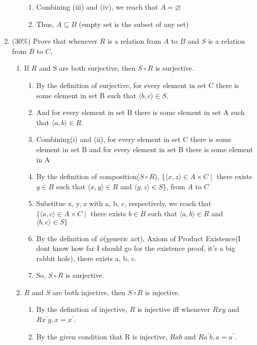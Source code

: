 \documentclass[10pt]{article}
\begin{document}
\begin{enumerate}
\begin{enumerate}
\begin{enumerate}
        \item Combining (iii) and (iv), we reach that $A = \varnothing$
        \item Thus, $A \subseteq B$ (empty set is the subset of any set)
      \end{enumerate}
    \end{enumerate}
  \item (30\%) Prove that whenever $R$ is a relation from $A$ to $B$ and $S$ is a relation from $B$ to $C$,
  \begin{enumerate}
    \item If $R$ and $\mathrm{S}$ are both surjective, then $S \circ R$ is surjective.
      \begin{enumerate}
        \item By the definition of surjective, for every element in set C there is some element in set B such that $\langle b, c\rangle \in S$.
        \item And for every element in set B there is some element in set A such that $\langle a, b\rangle \in R$.
        \item Combining(i) and (ii), for every element in set C there is some element in set B and for every element in set B there is some element in A
        \item By the definition of composition($S \circ R$), $\{\langle x, z\rangle \in A \times C \mid$ there exists $y \in B$ such that $\langle x, y\rangle \in R$ and $\langle y, z\rangle \in S\}$, from $A$ to $C$
        \item Substitue x, y, z with a, b, c, respectively, we reach that $\{\langle a, c\rangle \in A \times C \mid$ there exists $b \in B$ such that $\langle a, b\rangle \in R$ and $\langle b, c\rangle \in S\}$
        \item By the definition of $\phi$(generic act), Axiom of Product Existence(I dont know how far I should go for the existence proof, it's a big rabbit hole), there exists a, b, c.
        \item So, $S \circ R$ is surjective.
      \end{enumerate}
    \item $R$ and $S$ are both injective, then $S \circ R$ is injective.
      \begin{enumerate}
        \item By the definition of injective, $R$ is injective iff whenever $R x y$ and $R x^{\prime} y, x=x^{\prime}$.
        \item By the given condition that R is injective, $R a b$ and $R a^{\prime} b, a=a^{\prime}$.

\end{enumerate}
\end{enumerate}
\end{enumerate}
\end{document}
